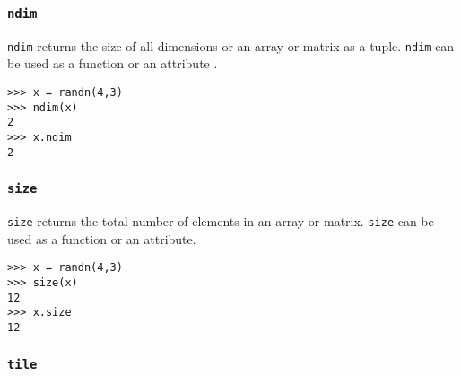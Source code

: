 \documentclass[Pydata.tex]{subfiles}
\begin{document}
\subsubsection*{\texttt{ndim}}
\texttt{ndim} returns the size of all dimensions or an array or matrix as a tuple. \texttt{ndim} can be used as a function or
an attribute .
\begin{framed}
\begin{verbatim}
>>> x = randn(4,3)
>>> ndim(x)
2
>>> x.ndim
2
\end{verbatim}
\end{framed}
\subsubsection*{\texttt{size}}
\texttt{size} returns the total number of elements in an array or matrix. \texttt{size} can be used as a function or an
attribute.
\begin{framed}
\begin{verbatim}
>>> x = randn(4,3)
>>> size(x)
12
>>> x.size
12
\end{verbatim}
\end{framed}

\subsubsection*{\texttt{tile}}
\end{document}
